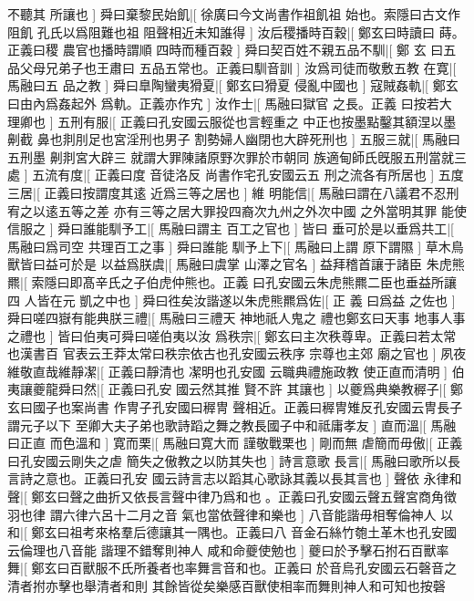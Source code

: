 不聽其%
所讓也%
]%
舜曰棄黎民始飢|[%
徐廣曰今文尚書作祖飢祖%
始也。索隱曰古文作阻飢%
%
孔氏以爲阻難也祖%
阻聲相近未知誰得%
]%
汝后稷播時百穀|[%
鄭玄曰時讀曰%
蒔。正義曰稷%
%
農官也播時謂順%
四時而種百穀%
]%
舜曰契百姓不親五品不馴|[%
鄭%
玄%
%
曰五品父母兄弟子也王肅曰%
五品五常也。正義曰馴音訓%
]%
汝爲司徒而敬敷五教%
在寛|[%
馬融曰五%
品之教%
]%
舜曰臯陶蠻夷猾夏|[%
鄭玄曰猾夏%
侵亂中國也%
]%
寇賊姦軌|[%
鄭玄曰由內爲姦起外%
爲軌。正義亦作宄%
]%
汝作士|[%
馬融曰獄官%
之長。正義%
%
曰按若大%
理卿也%
]%
五刑有服|[%
正義曰孔安國云服從也言輕重之%
中正也按墨點鑿其額涅以墨劓截%
%
鼻也剕刖足也宮淫刑也男子%
割勢婦人幽閉也大辟死刑也%
]%
五服三就|[%
馬融曰五刑墨%
劓剕宮大辟三%
%
就謂大罪陳諸原野次罪於市朝同%
族適甸師氏旣服五刑當就三處%
]%
五流有度|[%
正義曰度%
音徒洛反%
%
尚書作宅孔安國云五%
刑之流各有所居也%
]%
五度三居|[%
正義曰按謂度其逺%
近爲三等之居也%
]%
維%
明能信|[%
馬融曰謂在八議君不忍刑宥之以逺五等之差%
亦有三等之居大罪投四裔次九州之外次中國%
%
之外當明其罪%
能使信服之%
]%
舜曰誰能馴予工|[%
馬融曰謂主%
百工之官也%
]%
皆曰%
垂可於是以垂爲共工|[%
馬融曰爲司空%
共理百工之事%
]%
舜曰誰能%
馴予上下|[%
馬融曰上謂%
原下謂隰%
]%
草木鳥獸皆曰益可於是%
以益爲朕虞|[%
馬融曰虞掌%
山澤之官名%
]%
益拜稽首讓于諸臣%
朱虎熊羆|[%
索隱曰即髙辛氏之子伯虎仲熊也。正義%
曰孔安國云朱虎熊羆二臣也垂益所讓四%
%
人皆在元%
凱之中也%
]%
舜曰徃矣汝諧遂以朱虎熊羆爲佐|[%
正%
義%
%
曰爲益%
之佐也%
]%
舜曰嗟四嶽有能典朕三禮|[%
馬融曰三禮天%
神地祇人鬼之%
%
禮也鄭玄曰天事%
地事人事之禮也%
]%
皆曰伯夷可舜曰嗟伯夷以汝%
爲秩宗|[%
鄭玄曰主次秩尊卑。正義曰若太常也漢書百%
官表云王莽太常曰秩宗依古也孔安國云秩序%
%
宗尊也主郊%
廟之官也%
]%
夙夜維敬直哉維靜㓗|[%
正義曰靜清也%
㓗明也孔安國%
%
云職典禮施政教%
使正直而清明%
]%
伯夷讓夔龍舜曰然|[%
正義曰孔安%
國云然其推%
%
賢不許%
其讓也%
]%
以夔爲典樂教稺子|[%
鄭玄曰國子也案尚書%
作冑子孔安國曰稺冑%
%
聲相近。正義曰稺冑雉反孔安國云冑長子謂元子以下%
至卿大夫子弟也歌詩蹈之舞之教長國子中和祗庸孝友%
]%
直而溫|[%
馬融曰正直%
而色溫和%
]%
寛而栗|[%
馬融曰寛大而%
謹敬戰栗也%
]%
剛而無%
虐簡而毋傲|[%
正義曰孔安國云剛失之虐%
簡失之傲教之以防其失也%
]%
詩言意歌%
長言|[%
馬融曰歌所以長言詩之意也。正義曰孔安%
國云詩言志以蹈其心歌詠其義以長其言也%
]%
聲依%
永律和聲|[%
鄭玄曰聲之曲折又依長言聲中律乃爲和也%
。正義曰孔安國云聲五聲宮商角徴羽也律%
%
謂六律六呂十二月之音%
氣也當依聲律和樂也%
]%
八音能諧毋相奪倫神人%
以和|[%
鄭玄曰祖考來格羣后德讓其一隅也。正義曰八%
音金石絲竹匏土革木也孔安國云倫理也八音能%
%
諧理不錯奪則神人%
咸和命夔使勉也%
]%
夔曰於予擊石拊石百獸率%
舞|[%
鄭玄曰百獸服不氏所養者也率舞言音和也。正義曰%
於音烏孔安國云石磬音之清者拊亦擊也舉清者和則%
%
其餘皆從矣樂感百獸使相率而舞則神人和可知也按磬%
